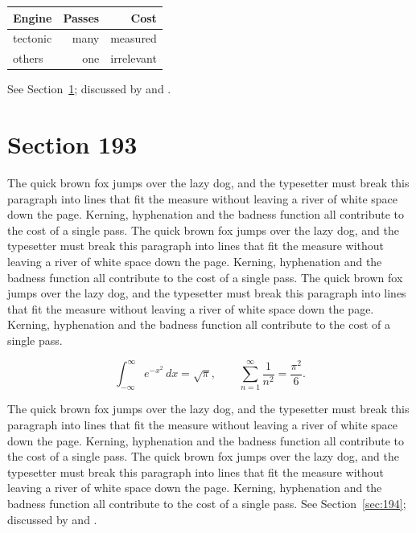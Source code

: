 \documentclass{article}
\begin{document}
\begin{center}
\begin{tabular}{lrr}
\toprule
Engine & Passes & Cost \\
\midrule
tectonic & many & measured \\
others & one & irrelevant \\
\bottomrule
\end{tabular}
\end{center}

See Section~\ref{sec:193}; discussed by \textcite{k3} and \textcite{l5}.
\section{Section 193}
\label{sec:193}
The quick brown fox jumps over the lazy dog, and the typesetter must break this paragraph into lines that fit the measure without leaving a river of white space down the page. Kerning, hyphenation and the badness function all contribute to the cost of a single pass. The quick brown fox jumps over the lazy dog, and the typesetter must break this paragraph into lines that fit the measure without leaving a river of white space down the page. Kerning, hyphenation and the badness function all contribute to the cost of a single pass. The quick brown fox jumps over the lazy dog, and the typesetter must break this paragraph into lines that fit the measure without leaving a river of white space down the page. Kerning, hyphenation and the badness function all contribute to the cost of a single pass. 

\begin{equation}\label{eq:193}
\int_{-\infty}^{\infty} e^{-x^{2}}\,dx = \sqrt{\pi}, \qquad
\sum_{n=1}^{\infty} \frac{1}{n^{2}} = \frac{\pi^{2}}{6}.
\end{equation}

The quick brown fox jumps over the lazy dog, and the typesetter must break this paragraph into lines that fit the measure without leaving a river of white space down the page. Kerning, hyphenation and the badness function all contribute to the cost of a single pass. The quick brown fox jumps over the lazy dog, and the typesetter must break this paragraph into lines that fit the measure without leaving a river of white space down the page. Kerning, hyphenation and the badness function all contribute to the cost of a single pass. 
See Section~\ref{sec:194}; discussed by \textcite{k4} and \textcite{l1}.
\end{document}
